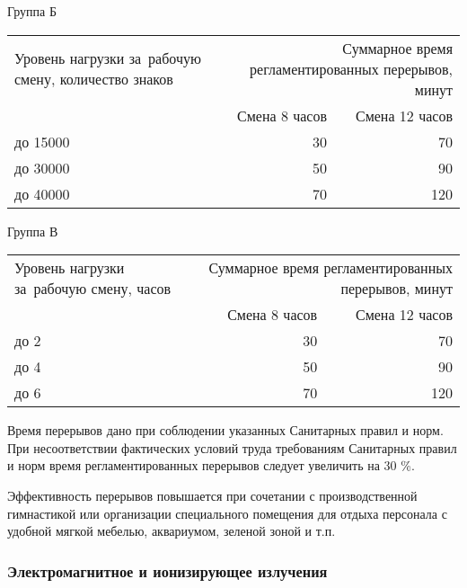 \begin{dtable}{Группа Б}
	\begin{tabular}{|m{4cm}|r|r|}
		\hline	Уровень нагрузки за~рабочую смену, количест­во знаков
			& \multicolumn{2}{m{7cm}|}{Суммарное время регламентированных перерывов, минут } \\
		\cline{2-3}   															&	Смена 8 часов 	&	Смена 12 часов  \\
		\hline	до 15000
																					& 	30 		  &		70		    \\
		\hline	до 30000
																					& 	50 		  &		90		    \\
		\hline	до 40000 
																					& 	70 		  &		120		    \\
		\hline 
	\end{tabular} 
\end{dtable}


\begin{dtable}{Группа В}
	\vspace{1cm}
	\begin{tabular}{|m{4cm}|r|r|}
		\hline	Уровень нагрузки за~рабочую смену, часов
			& \multicolumn{2}{m{7cm}|}{Суммарное время регламентированных перерывов, минут } \\
		\cline{2-3}   															&	Смена 8 часов 	&	Смена 12 часов  \\
		\hline	до 2 
																					& 	30 		  &		70		    \\
		\hline	до 4
																					& 	50 		  &		90		    \\
		\hline	до 6
																					& 	70 		  &		120		    \\
		\hline 
	\end{tabular} 
	\vspace{1cm}
\end{dtable}

Время перерывов дано при соблюдении указанных Санитарных правил и норм. 
При несоответствии фактических условий труда требованиям Санитарных правил 
и норм время регламентированных перерывов следует увеличить на 30 \%. 

Эффективность перерывов повышается при сочетании с производственной 
гимнастикой или организации специального помещения для отдыха персонала 
с удобной мягкой мебелью, аквариумом, зеленой зоной и т.п. 


\subsubsection{Электромагнитное и ионизирующее излучения}

